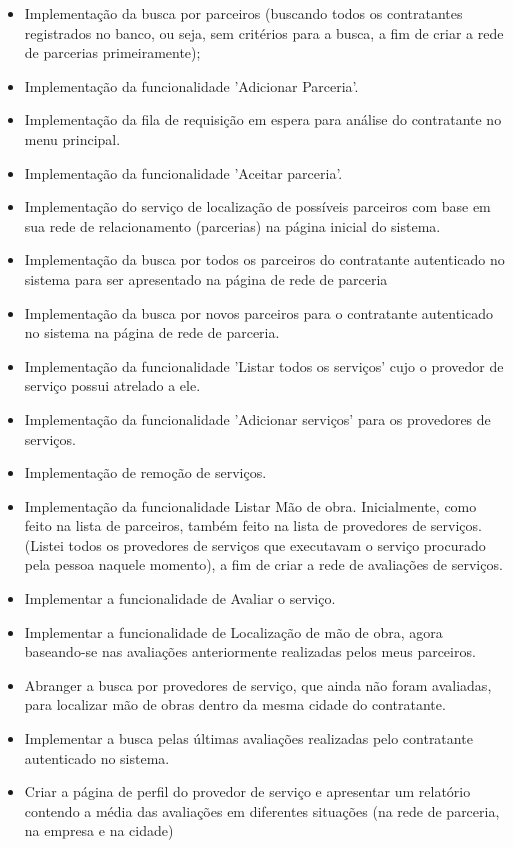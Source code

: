\begin{itemize}
		\item Implementação da busca por parceiros (buscando todos os contratantes registrados no banco, ou seja, sem critérios para a busca, a fim de criar a rede de parcerias primeiramente);
		\item Implementação da funcionalidade 'Adicionar Parceria'.
		\item Implementação da fila de requisição em espera para análise do contratante no menu principal.
		\item Implementação da funcionalidade 'Aceitar parceria'.
		\item Implementação do serviço de localização de possíveis parceiros com base em sua rede de relacionamento (parcerias) na página inicial do sistema.
		\item Implementação da busca por todos os parceiros do contratante autenticado no sistema para ser apresentado na página de rede de parceria
		\item Implementação da busca por novos parceiros para o contratante autenticado no sistema na página de rede de parceria.
		\item Implementação da funcionalidade 'Listar todos os serviços' cujo o provedor de serviço possui atrelado a ele.
		\item Implementação da funcionalidade 'Adicionar serviços' para os provedores de serviços.
		\item Implementação de remoção de serviços.
		\item Implementação da funcionalidade Listar Mão de obra. Inicialmente, como feito na lista de parceiros, também feito na lista de provedores de serviços. (Listei todos os provedores de serviços que executavam o serviço procurado pela pessoa naquele momento), a fim de criar a rede de avaliações de serviços.
		\item Implementar a funcionalidade de Avaliar o serviço.
		\item Implementar a funcionalidade de Localização de mão de obra, agora baseando-se nas avaliações anteriormente realizadas pelos meus parceiros.
		\item Abranger a busca por provedores de serviço, que ainda não foram avaliadas, para localizar mão de obras dentro da mesma cidade do contratante.
		\item Implementar a busca pelas últimas avaliações realizadas pelo contratante autenticado no sistema.
		\item Criar a página de perfil do provedor de serviço e apresentar um relatório contendo a média das avaliações em diferentes situações (na rede de parceria, na empresa e na cidade)

\end{itemize}
